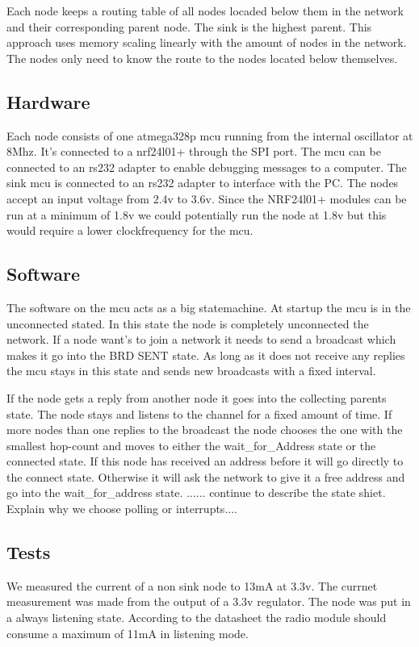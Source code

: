 \documentclass[a4paper,11pt]{article}
\begin{document}
Each node keeps a routing table of all nodes locaded below them in the
network and their corresponding parent node. The sink is the highest
parent. This approach uses memory scaling linearly with the amount of
nodes in the network. The nodes only need to know the route to the
nodes located below themselves.

\subsection{Hardware}
Each node consists of one atmega328p mcu running from the
internal oscillator at 8Mhz. It's connected to a nrf24l01+ through the
SPI port. The mcu can be connected to an rs232 adapter to enable
debugging messages to a computer. The sink mcu is connected to an
rs232 adapter to interface with the PC. The nodes accept an input
voltage from 2.4v to 3.6v. Since the NRF24l01+ modules can be run at a
minimum of 1.8v we could potentially run the node at 1.8v but this
would require a lower clockfrequency for the mcu.



\subsection{Software}
The software on the mcu acts as a big statemachine. At startup the mcu
is in the unconnected stated. In this state the node is completely
unconnected the network. If a node want's to join a network it needs
to send a broadcast which makes it go into the BRD SENT state. As long
as it does not receive any replies the mcu stays in this state and
sends new broadcasts with a fixed interval.

If the node gets a reply from another node it goes into the
collecting parents state. The node stays and listens to the channel for
a fixed amount of time. If more nodes than one replies to the
broadcast the node chooses the one with the smallest hop-count and moves to
either the wait\_for\_Address state or the connected state.  If this
node has received an address before it will go directly to the connect
state. Otherwise it will ask the network to give it a free address and
go into the wait\_for\_address state.  ...... continue to describe the
state shiet. Explain why we choose polling or interrupts....


\subsection{Tests}
We measured the current of a non sink node to 13mA at 3.3v. The
currnet measurement was made from the output of a 3.3v regulator. 
The node was put in a always listening state. According to the 
datasheet the radio module should consume a maximum of 11mA in
listening mode.
\end{document}

